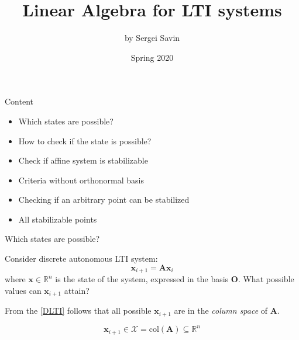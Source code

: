 \documentclass{beamer}
\title{ Linear Algebra for LTI systems}
\author{by Sergei Savin}
\date{Spring 2020}
\begin{document}
\maketitle


\begin{frame}{Content}

\begin{itemize}
\item Which states are possible?
\item How to check if the state is possible?
\item Check if affine system is stabilizable
\item Criteria without orthonormal basis
\item Checking if an arbitrary point can be stabilized
\item All stabilizable points
\end{itemize}

\end{frame}




\begin{frame}{Which states are possible?}
\begin{flushleft}

Consider discrete autonomous LTI system:
%
\begin{equation}
\label{DLTI}
    \mathbf x_{i+1} = \mathbf A \mathbf x_i
\end{equation}
%
where $\mathbf x \in \mathbb{R}^n$ is the state of the system, expressed in the basis $\mathbf O$. What possible values can $\mathbf x_{i+1}$ attain?

\bigskip

From the \eqref{DLTI} follows that all possible $\mathbf x_{i+1}$ are in the \emph{column space} of $\mathbf A$.

\[
\mathbf x_{i+1} \in \mathcal{X} = \text{col} (\mathbf A) \subseteq \mathbb{R}^n
\]



\end{flushleft}
\end{frame}
\end{document}
